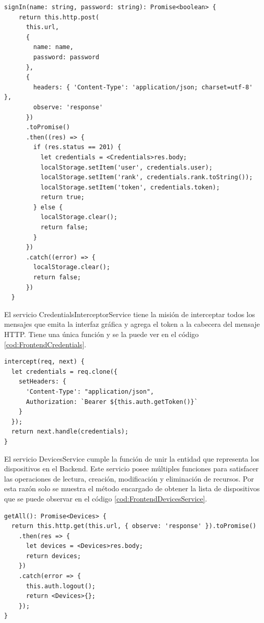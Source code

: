 \begin{lstlisting}[label=cod:FrontendAuthService,caption=Obtención de credenciales]
signIn(name: string, password: string): Promise<boolean> {
    return this.http.post(
      this.url,
      {
        name: name,
        password: password
      },
      {
        headers: { 'Content-Type': 'application/json; charset=utf-8' },
        observe: 'response'
      })
      .toPromise()
      .then((res) => {
        if (res.status == 201) {
          let credentials = <Credentials>res.body;
          localStorage.setItem('user', credentials.user);
          localStorage.setItem('rank', credentials.rank.toString());
          localStorage.setItem('token', credentials.token);
          return true;
        } else {
          localStorage.clear();
          return false;
        }
      })
      .catch((error) => {
        localStorage.clear();
        return false;
      })
  }
\end{lstlisting}

El servicio CredentialsInterceptorService tiene la misión de interceptar todos los mensajes que emita la interfaz gráfica y agrega el token a la cabecera del mensaje HTTP.
Tiene una única función y se la puede ver en el código \ref{cod:FrontendCredentials}.

\begin{lstlisting}[label=cod:FrontendCredentials,caption=Intercepción de mensajes]
intercept(req, next) {
  let credentials = req.clone({
    setHeaders: {
      'Content-Type': "application/json",
      Authorization: `Bearer ${this.auth.getToken()}`
    }
  });
  return next.handle(credentials);
}
\end{lstlisting}

El servicio DevicesService cumple la función de unir la entidad que representa los dispositivos en el Backend.
Este servicio posee múltiples funciones para satisfacer las operaciones de lectura, creación, modificación y eliminación de recursos.
Por esta razón solo se muestra el método encargado de obtener la lista de dispositivos que se puede observar en el código \ref{cod:FrontendDevicesService}.

\begin{lstlisting}[label=cod:FrontendDevicesService,caption=Obtención de la lista de dispositivos]
getAll(): Promise<Devices> {
  return this.http.get(this.url, { observe: 'response' }).toPromise()
    .then(res => {
      let devices = <Devices>res.body;
      return devices;
    })
    .catch(error => {
      this.auth.logout();
      return <Devices>{};
    });
}
\end{lstlisting}

